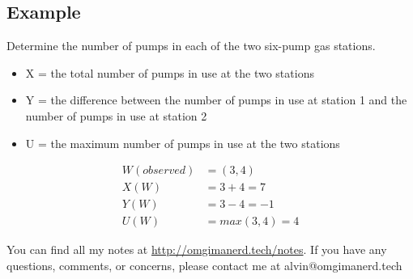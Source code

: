 \documentclass[letterpaper, 12pt]{math}
\begin{document}
\subsection*{Example}
Determine the number of pumps in each of the two six-pump gas stations.
\begin{itemize}
  \item X = the total number of pumps in use at the two stations
  \item Y = the difference between the number of pumps in use at station 1 and
    the number of pumps in use at station 2
  \item U = the maximum number of pumps in use at the two stations
\end{itemize}
\begin{align*}
  W(observed) &= (3,4) \\
  X(W) &= 3+4 = 7 \\
  Y(W) &= 3-4 = -1 \\
  U(W) &= max(3,4) = 4
\end{align*}

\begin{center}
  You can find all my notes at \url{http://omgimanerd.tech/notes}. If you have
  any questions, comments, or concerns, please contact me at
  alvin@omgimanerd.tech
\end{center}
\end{document}
